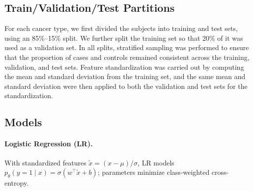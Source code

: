 \documentclass[journal,article,submit,pdftex,moreauthors]{Definitions/mdpi}
\begin{document}

\subsection{Train/Validation/Test Partitions}
For each cancer type, we first divided the subjects into training and test sets, using an 85\%--15\% split. 
We further split the training set so that 20\% of it was used as a validation set. 
In all splits, stratified sampling was performed to ensure that the proportion of cases and controls remained consistent across the training, validation, and test sets. 
Feature standardization was carried out by computing the mean and standard deviation from the training set, and the same mean and standard deviation were then applied to both the validation and test sets for the standardization.


\subsection{Models}

\paragraph{Logistic Regression (LR).} With standardized features $\tilde{x}=(x-\mu)/\sigma$, LR models $p_\theta(y = 1\mid x)=\sigma(w^\top \tilde{x}+b)$; parameters minimize class-weighted cross-entropy.
\end{document}
